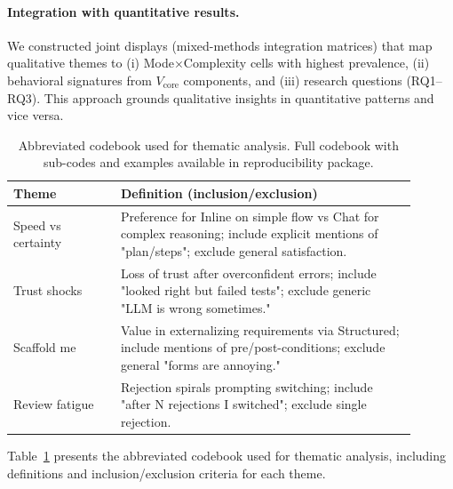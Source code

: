 \documentclass[sigconf]{acmart}
\begin{document}
\paragraph{Integration with quantitative results.}
We constructed joint displays (mixed-methods integration matrices) that map qualitative themes to (i) Mode\(\times\)Complexity cells with highest prevalence, (ii) behavioral signatures from $V_{\text{core}}$ components, and (iii) research questions (RQ1--RQ3). This approach grounds qualitative insights in quantitative patterns and vice versa.

\begin{table}[h]
  \centering
  \caption{Abbreviated codebook used for thematic analysis. Full codebook with sub-codes and examples available in reproducibility package.}
  \label{tab:codebook}
  \small
  \begin{tabular}{p{0.24\linewidth} p{0.66\linewidth}}
    \toprule
    \textbf{Theme} & \textbf{Definition (inclusion/exclusion)} \\
    \midrule
    Speed vs certainty & Preference for Inline on simple flow vs Chat for complex reasoning; include explicit mentions of "plan/steps"; exclude general satisfaction. \\
    Trust shocks & Loss of trust after overconfident errors; include "looked right but failed tests"; exclude generic "LLM is wrong sometimes." \\
    Scaffold me & Value in externalizing requirements via Structured; include mentions of pre/post-conditions; exclude general "forms are annoying." \\
    Review fatigue & Rejection spirals prompting switching; include "after N rejections I switched"; exclude single rejection. \\
    \bottomrule
  \end{tabular}
\end{table}

Table~\ref{tab:codebook} presents the abbreviated codebook used for thematic analysis, including definitions and inclusion/exclusion criteria for each theme.
\end{document}
